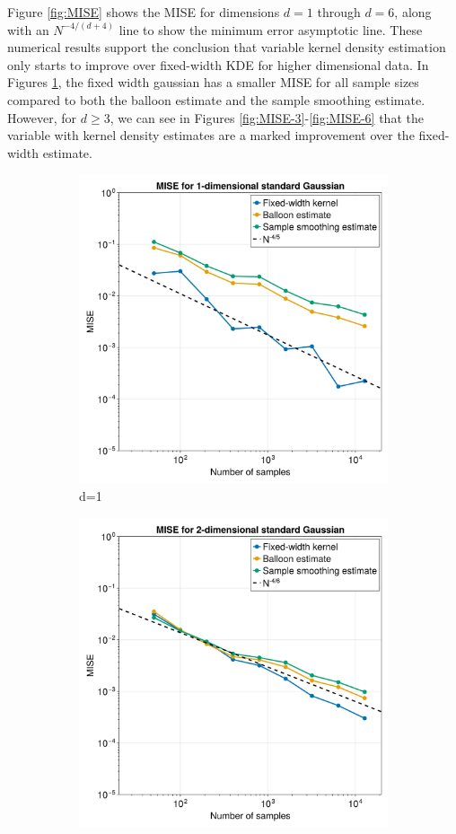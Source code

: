 \documentclass{article}
\begin{document}
Figure \ref{fig:MISE} shows the MISE for dimensions $d=1$ through $d=6$, along with an $N^{-4/(d+4)}$ line to show the minimum error asymptotic line. These numerical results support the conclusion that variable kernel density estimation only starts to improve over fixed-width KDE for higher dimensional data. In Figures \ref{fig:MISE-1}, the fixed width gaussian has a smaller MISE for all sample sizes compared to both the balloon estimate and the sample smoothing estimate. However, for $d\geq3$, we can see in Figures \ref{fig:MISE-3}-\ref{fig:MISE-6} that the variable with kernel density estimates are a marked improvement over the fixed-width estimate.

\begin{figure}
\begin{subfigure}{.5\textwidth}
  \centering
  \includegraphics[width=.8\linewidth]{images/updated_k_MISE_d=1.png}
  \caption{d=1}
  \label{fig:MISE-1}
\end{subfigure}%
\begin{subfigure}{.5\textwidth}
  \centering
  \includegraphics[width=.8\linewidth]{images/updated_k_MISE_d=2.png}

\end{subfigure}
\end{figure}
\end{document}
